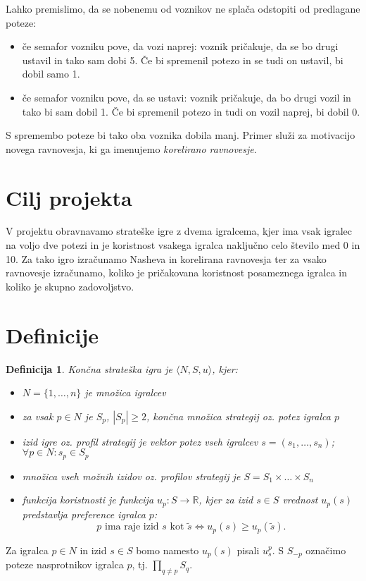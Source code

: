 \documentclass{article}
\newtheorem{definition}{Definicija}
\begin{document}
Lahko premislimo, da se nobenemu od voznikov ne splača odstopiti od predlagane poteze:
\begin{itemize}
    \item če semafor vozniku pove, da vozi naprej: voznik pričakuje, da se bo drugi ustavil in tako sam dobi 5. Če bi spremenil potezo in se tudi on ustavil, bi dobil samo 1.
    \item če semafor vozniku pove, da se ustavi: voznik pričakuje, da bo drugi vozil in tako bi sam dobil 1. Če bi spremenil potezo in tudi on vozil naprej, bi dobil 0.
\end{itemize}
S spremembo poteze bi tako oba voznika dobila manj. Primer služi za motivacijo novega ravnovesja, ki ga imenujemo \emph{korelirano ravnovesje}.

\section{Cilj projekta}
V projektu obravnavamo strateške igre z dvema igralcema, kjer ima vsak igralec na voljo dve potezi in je koristnost vsakega igralca naključno celo število med 0 in 10. Za tako igro izračunamo Nasheva in korelirana ravnovesja ter za vsako ravnovesje izračunamo, koliko je pričakovana koristnost posameznega igralca in koliko je skupno zadovoljstvo.
\section{Definicije}
\begin{definition}
    \emph{Končna strateška igra} je $\langle N, S, u \rangle$, kjer:
    \begin{itemize}
        \item $N = \{ 1, \dots, n \}$ je \emph{množica igralcev}
        \item za vsak $p \in N$ je $S_p$, $|S_p|\geq 2$, končna množica \emph{strategij} oz. \emph{potez} igralca $p$
        \item \emph{izid igre} oz. \emph{profil strategij} je vektor potez vseh igralcev $s = (s_1, \dots, s_n)$; $\forall p \in N: s_p \in S_p$
        \item \emph{množica vseh možnih izidov} oz. \emph{profilov strategij} je $S = S_1 \times \dots \times S_n$ 
        \item \emph{funkcija koristnosti} je funkcija $u_p: S \to \mathbb{R}$, kjer za izid $s \in S$ vrednost $u_p(s)$ predstavlja preference igralca $p$: 
        $$ \text{$p$ ima raje izid $s$ kot $\tilde{s}$} \iff u_p(s) \geq u_p(\tilde{s}). $$
    \end{itemize}
\end{definition}
Za igralca $p\in N$ in izid $s \in S$ bomo namesto $u_p(s)$ pisali $u_s^p$. S $S_{-p}$ označimo poteze nasprotnikov igralca $p$, tj. $\prod\limits_{q \neq p} S_q$.
\end{document}
